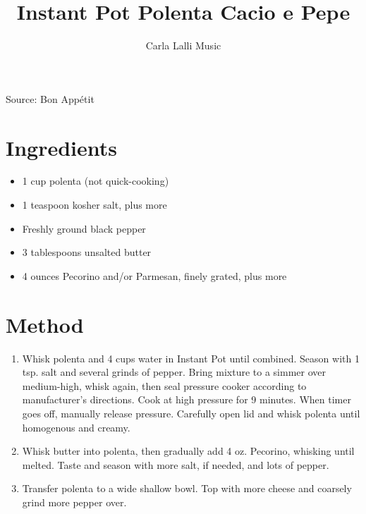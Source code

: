 \documentclass[12pt]{article}
\author{Carla Lalli Music}
\title{Instant Pot Polenta Cacio e Pepe}
\date{}
\begin{document}
\begin{multicols*}{2}
\maketitle

Source: Bon Appétit

\section{Ingredients}

\begin{itemize}
    \item 1 cup polenta (not quick-cooking)
    \item 1 teaspoon kosher salt, plus more
    \item Freshly ground black pepper
    \item 3 tablespoons unsalted butter
    \item 4 ounces Pecorino and/or Parmesan, finely grated, plus more
\end{itemize}

\section{Method}

\begin{enumerate}
    \item Whisk polenta and 4 cups water in Instant Pot until combined. Season with 1 tsp. salt and several grinds of pepper. Bring mixture to a simmer over medium-high, whisk again, then seal pressure cooker according to manufacturer’s directions. Cook at high pressure for 9 minutes. When timer goes off, manually release pressure. Carefully open lid and whisk polenta until homogenous and creamy.
    \item Whisk butter into polenta, then gradually add 4 oz. Pecorino, whisking until melted. Taste and season with more salt, if needed, and lots of pepper.
    \item Transfer polenta to a wide shallow bowl. Top with more cheese and coarsely grind more pepper over.
\end{enumerate}

\end{multicols*}
\end{document}
